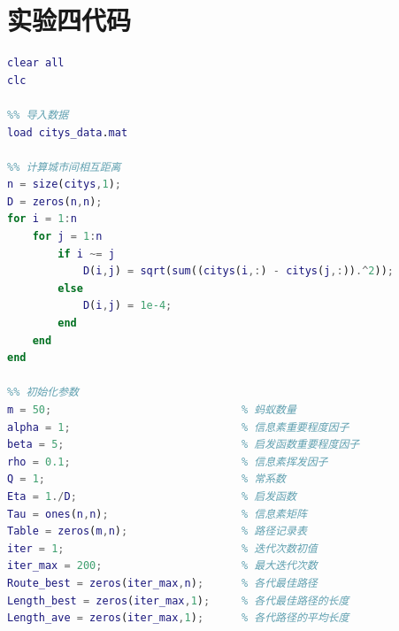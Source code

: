 \documentclass{cumcmthesis}
\begin{document}
\section{实验四代码}
\begin{lstlisting}[language=Matlab]
%% 清空环境变量
clear all
clc

%% 导入数据
load citys_data.mat

%% 计算城市间相互距离
n = size(citys,1);
D = zeros(n,n);
for i = 1:n
    for j = 1:n
        if i ~= j
            D(i,j) = sqrt(sum((citys(i,:) - citys(j,:)).^2));
        else
            D(i,j) = 1e-4;      
        end
    end    
end

%% 初始化参数
m = 50;                              % 蚂蚁数量
alpha = 1;                           % 信息素重要程度因子
beta = 5;                            % 启发函数重要程度因子
rho = 0.1;                           % 信息素挥发因子
Q = 1;                               % 常系数
Eta = 1./D;                          % 启发函数
Tau = ones(n,n);                     % 信息素矩阵
Table = zeros(m,n);                  % 路径记录表
iter = 1;                            % 迭代次数初值
iter_max = 200;                      % 最大迭代次数 
Route_best = zeros(iter_max,n);      % 各代最佳路径       
Length_best = zeros(iter_max,1);     % 各代最佳路径的长度  
Length_ave = zeros(iter_max,1);      % 各代路径的平均长度  


\end{lstlisting}
\end{document}

